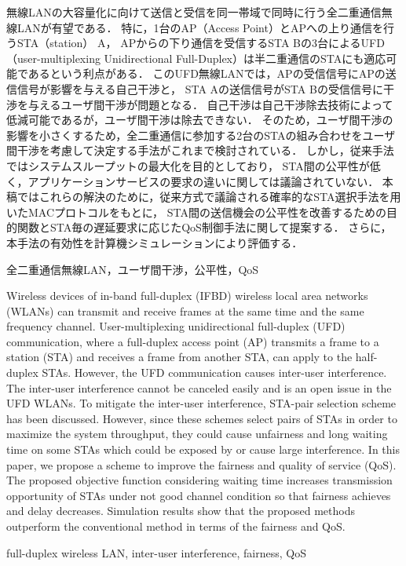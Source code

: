 \documentclass[technicalreport]{ieicej}
\begin{document}
\begin{jabstract}
	無線LANの大容量化に向けて送信と受信を同一帯域で同時に行う全二重通信無線LANが有望である．
	特に，1台のAP（Access Point）とAPへの上り通信を行うSTA（station） A，
	APからの下り通信を受信するSTA Bの3台によるUFD（user-multiplexing Unidirectional Full-Duplex）は半二重通信のSTAにも適応可能であるという利点がある．
	このUFD無線LANでは，APの受信信号にAPの送信信号が影響を与える自己干渉と，
	STA Aの送信信号がSTA Bの受信信号に干渉を与えるユーザ間干渉が問題となる．
	自己干渉は自己干渉除去技術によって低減可能であるが，ユーザ間干渉は除去できない．
	そのため，ユーザ間干渉の影響を小さくするため，全二重通信に参加する2台のSTAの組み合わせをユーザ間干渉を考慮して決定する手法がこれまで検討されている．
	しかし，従来手法ではシステムスループットの最大化を目的としており，
	STA間の公平性が低く，アプリケーションサービスの要求の違いに関しては議論されていない．
	本稿ではこれらの解決のために，従来方式で議論される確率的なSTA選択手法を用いたMACプロトコルをもとに，
	STA間の送信機会の公平性を改善するための目的関数とSTA毎の遅延要求に応じたQoS制御手法に関して提案する．
	さらに，本手法の有効性を計算機シミュレーションにより評価する．
\end{jabstract}
\begin{jkeyword}
全二重通信無線LAN，ユーザ間干渉，公平性，QoS
\end{jkeyword}
\begin{eabstract}
	Wireless devices of in-band full-duplex (IFBD) wireless local area networks (WLANs) can transmit and receive frames at the same time and the same frequency channel.
	User-multiplexing unidirectional full-duplex (UFD) communication, where a full-duplex access point (AP) transmits a frame to a station (STA) and receives a frame from another STA, can apply to the half-duplex STAs.
	However, the UFD communication causes inter-user interference.
	The inter-user interference cannot be canceled easily and is an open issue in the UFD WLANs.
	To mitigate the inter-user interference, STA-pair selection scheme has been discussed.
	However, since these schemes select pairs of STAs in order to maximize the system throughput, they could cause unfairness and long waiting time on some STAs which could be exposed by or cause large interference.
	In this paper, we propose a scheme to improve the fairness and quality of service (QoS).
	The proposed objective function considering waiting time increases transmission opportunity of STAs under not good channel condition so that fairness achieves and delay decreases.
	Simulation results show that the proposed methods outperform the conventional method in terms of the fairness and QoS.

\end{eabstract}
\begin{ekeyword}
full-duplex wireless LAN, inter-user interference, fairness, QoS
\end{ekeyword}
\end{document}
